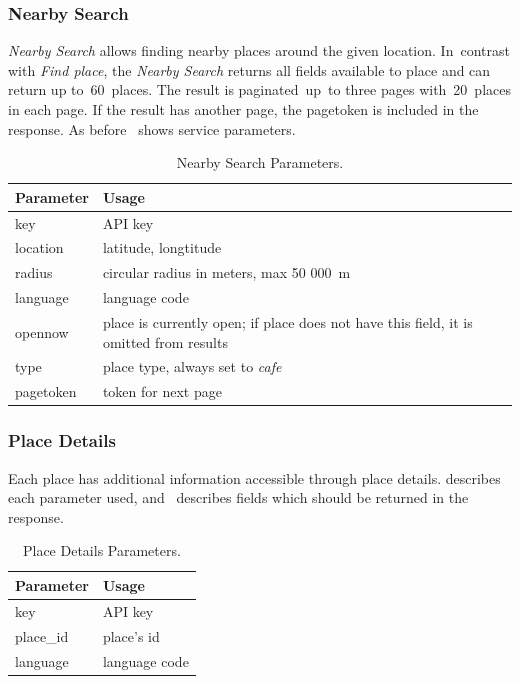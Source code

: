 \subsubsection{Nearby Search}
\textit{Nearby Search} allows finding nearby places around the given location. In~contrast with \textit{Find place}, the \textit{Nearby Search} returns all fields available to place and can return up to~60~places. The result is paginated~up~to three pages with~20~places in each page. If the result has another page, the pagetoken is included in the response. As before~ shows service parameters.

\begin{table}[htbp]
\centering
\begin{tabularx}{\textwidth}{|l|X|}
\hline
\textbf{Parameter} & \textbf{Usage} \\ \hline
key                & API key \\ \hline
location           & latitude, longtitude \\ \hline
radius             & circular radius in meters, max 50 000~m  \\ \hline
language           & language code \\ \hline
opennow         & place is currently open; if place does not have this field, it is omitted from results  \\ \hline
type & place type, always set to \textit{cafe} \\ \hline
pagetoken & token for next page \\ \hline 
\end{tabularx}
\caption{Nearby Search Parameters.}
\label{table:gapi-nearby-search-parameters}
\end{table}
\subsubsection{Place Details}
Each place has additional information accessible through place details.  describes each parameter used, and~ describes fields which should be returned in the response.

\begin{table}[htbp]
\centering
\begin{tabularx}{\textwidth}{|l|X|}
\hline
\textbf{Parameter} & \textbf{Usage} \\ \hline
key                & API key \\ \hline
place\_id           & place's id \\ \hline
language           & language code \\ \hline
\end{tabularx}
\caption{Place Details Parameters.}
\label{table:gapi-details-parameters}
\end{table}


